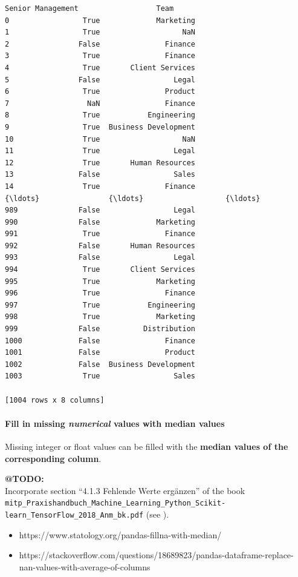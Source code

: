 \documentclass [oneside,10pt,a4paper,ngerman,BCOR10mm,headsepline,parindent,final]{scrartcl}
\providecommand{\tightlist}{%
      \setlength{\itemsep}{0pt}\setlength{\parskip}{0pt}}
\begin{document}
\begin{tcolorbox}[breakable, size=fbox, boxrule=.5pt, pad at break*=1mm, opacityfill=0]
\begin{Verbatim}[commandchars=\\\{\}]
     Senior Management                  Team
0                 True             Marketing
1                 True                   NaN
2                False               Finance
3                 True               Finance
4                 True       Client Services
5                False                 Legal
6                 True               Product
7                  NaN               Finance
8                 True           Engineering
9                 True  Business Development
10                True                   NaN
11                True                 Legal
12                True       Human Resources
13               False                 Sales
14                True               Finance
{\ldots}                {\ldots}                   {\ldots}
989              False                 Legal
990              False             Marketing
991               True               Finance
992              False       Human Resources
993              False                 Legal
994               True       Client Services
995               True             Marketing
996               True               Finance
997               True           Engineering
998               True             Marketing
999              False          Distribution
1000             False               Finance
1001             False               Product
1002             False  Business Development
1003              True                 Sales

[1004 rows x 8 columns]
\end{Verbatim}
\end{tcolorbox}
        
    \hypertarget{fill-in-missing-numerical-values-with-median-values}{%
\paragraph{\texorpdfstring{Fill in missing \emph{numerical} values with
median
values}{Fill in missing numerical values with median values}}\label{fill-in-missing-numerical-values-with-median-values}}

Missing integer or float values can be filled with the \textbf{median
values of the corresponding column}.

\textbf{@TODO:}\\
Incorporate section ``4.1.3 Fehlende Werte ergänzen'' of the book
\texttt{mitp\_Praxishandbuch\_Machine\_Learning\_Python\_Scikit-learn\_TensorFlow\_2018\_Anm\_bk.pdf}
(see \cite{ML_ScL_2018}).

\begin{itemize}
\tightlist
\item
  https://www.statology.org/pandas-fillna-with-median/
\item
  https://stackoverflow.com/questions/18689823/pandas-dataframe-replace-nan-values-with-average-of-columns
\end{itemize}
\end{document}
